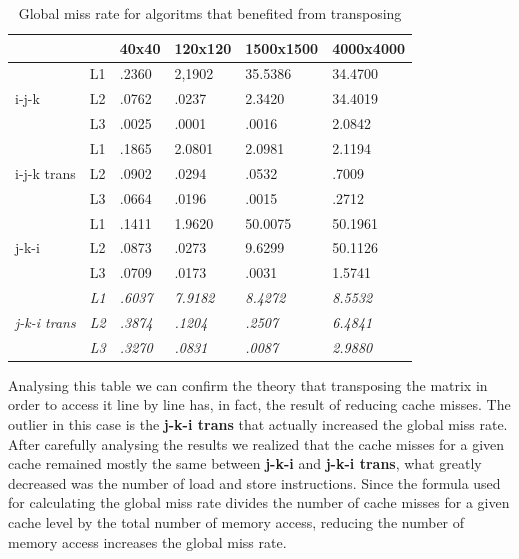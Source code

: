 \documentclass[a4paper]{report}
\begin{document}
\begin{table}[H]
\centering
\begin{tabular}{|l|l|l|l|l|l|}
\hline
\multicolumn{2}{|l|}{}            & 40x40 & 120x120 & 1500x1500 & 4000x4000 \\ \hline
\multirow{3}{*}{i-j-k}       & L1 & .2360 & 2,1902  & 35.5386   & 34.4700   \\ \cline{2-6}
                             & L2 & .0762 & .0237   & 2.3420    & 34.4019   \\ \cline{2-6}
                             & L3 & .0025 & .0001   & .0016     & 2.0842    \\ \hline
\multirow{3}{*}{i-j-k trans} & L1 & .1865 & 2.0801  & 2.0981    & 2.1194    \\ \cline{2-6}
                             & L2 & .0902 & .0294   & .0532     & .7009     \\ \cline{2-6}
                             & L3 & .0664 & .0196   & .0015     & .2712     \\ \hline
\multirow{3}{*}{j-k-i}       & L1 & .1411 & 1.9620  & 50.0075   & 50.1961   \\ \cline{2-6}
                             & L2 & .0873 & .0273   & 9.6299    & 50.1126   \\ \cline{2-6}
                             & L3 & .0709 & .0173   & .0031     & 1.5741    \\ \hline
\multirow{3}{*}{\textit{j-k-i trans}} & \textit{L1} & \textit{.6037} & \textit{7.9182}  & \textit{8.4272}    & \textit{8.5532}    \\ \cline{2-6}
                                      & \textit{L2} & \textit{.3874} & \textit{.1204}   & \textit{.2507}     & \textit{6.4841}    \\ \cline{2-6}
                                      & \textit{L3} & \textit{.3270} & \textit{.0831}   & \textit{.0087}     & \textit{2.9880}    \\ \hline
\end{tabular}
\caption{Global miss rate for algoritms that benefited from transposing}
\end{table}

Analysing this table we can confirm the theory that transposing the matrix
in order to access it line by line has, in fact, the result of reducing cache
misses. The outlier in this case is the \textbf{j-k-i trans} that actually
increased the global miss rate. After carefully analysing the results we
realized that the cache misses for a given cache remained mostly the same
between \textbf{j-k-i} and \textbf{j-k-i trans}, what greatly decreased was the
number of load and store instructions. Since the formula used for calculating
the global miss rate divides the number of cache misses for a given cache level
by the total number of memory access, reducing the number of memory access
increases the global miss rate.
\end{document}
